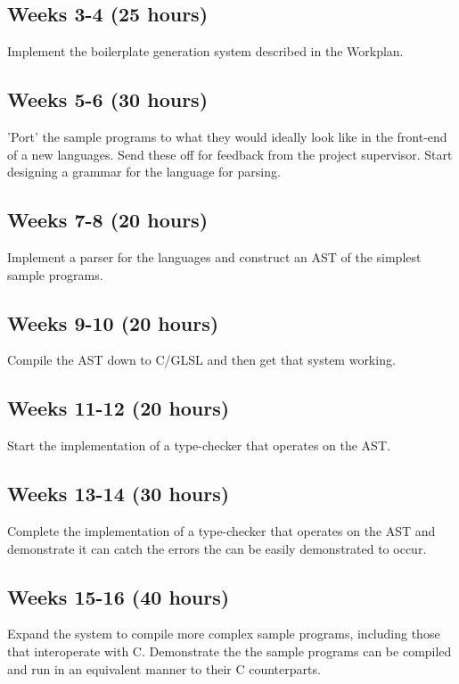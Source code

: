 \documentclass[11pt]{article}
\begin{document}
\subsection{Weeks 3-4 (25 hours)}

Implement the boilerplate generation system described in the Workplan.

\subsection{Weeks 5-6 (30 hours)}

'Port' the sample programs to what they would ideally look like in the
front-end of a new languages. Send these off for feedback from the project
supervisor. Start designing a grammar for the language for parsing.

\subsection{Weeks 7-8 (20 hours)}

Implement a parser for the languages and construct an AST of the simplest
sample programs.

\subsection{Weeks 9-10 (20 hours)}

Compile the AST down to C/GLSL and then get that system working.

\subsection{Weeks 11-12 (20 hours)}

Start the implementation of a type-checker that operates on the AST.

\subsection{Weeks 13-14 (30 hours)}

Complete the implementation of a type-checker that operates on the AST and
demonstrate it can catch the errors the can be easily demonstrated to occur.

\subsection{Weeks 15-16 (40 hours)}

Expand the system to compile more complex sample programs, including those that
interoperate with C. Demonstrate the the sample programs can be compiled and
run in an equivalent manner to their C counterparts.
\end{document}

